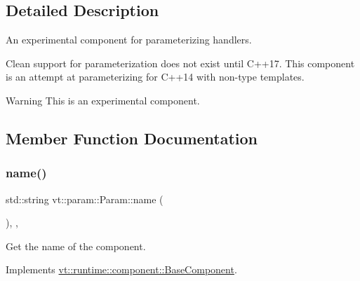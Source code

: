 \subsection{Detailed Description}
An experimental component for parameterizing handlers. 

Clean support for parameterization does not exist until C++17. This component is an attempt at parameterizing for C++14 with non-\/type templates.

\begin{DoxyWarning}{Warning}
This is an experimental component. 
\end{DoxyWarning}


\subsection{Member Function Documentation}
\mbox{\label{structvt_1_1param_1_1_param_a848380f8509c11b8bffcf0724af77127}} 
\subsubsection{\texorpdfstring{name()}{name()}}
{\footnotesize\ttfamily std\+::string vt\+::param\+::\+Param\+::name (\begin{DoxyParamCaption}{ }\end{DoxyParamCaption})\hspace{0.3cm}{\ttfamily [inline]}, {\ttfamily [override]}, {\ttfamily [virtual]}}



Get the name of the component. 



Implements \hyperlink{structvt_1_1runtime_1_1component_1_1_base_component_a7701485f3539f78d42e6bad47fc7eb78}{vt\+::runtime\+::component\+::\+Base\+Component}.

\mbox{\label{structvt_1_1param_1_1_param_a6b2fedacd76ee622efdb14038b0d82fe}} 
